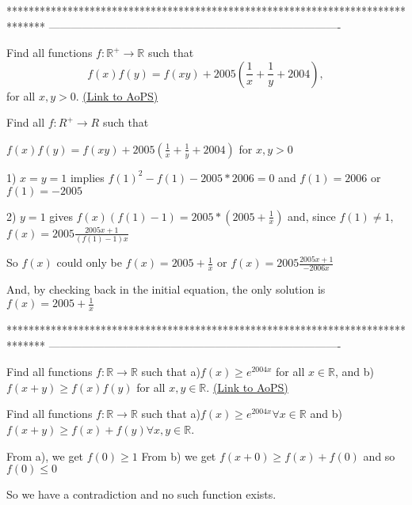 *******************************************************************************
-------------------------------------------------------------------------------

\begin{problem}
	Find all functions $ f: \mathbb R^{+}\rightarrow \mathbb R$ such that
\[f(x)f(y)=f(xy)+2005\left(\frac{1}{x}+\frac{1}{y}+2004\right),\]
for all $ x,y>0$.
	\flushright \href{https://artofproblemsolving.com/community/c6h156164}{(Link to AoPS)}
\end{problem}



\begin{mysolution}
	\begin{tcolorbox}Find all $ f: R^{+}\rightarrow R$ such that

$ f(x)f(y)=f(xy)+2005(\frac{1}{x}+\frac{1}{y}+2004)$ for $ x,y>0$\end{tcolorbox}

1) $ x=y=1$ implies $ f(1)^{2}-f(1)-2005*2006=0$ and $ f(1)=2006$ or $ f(1)=-2005$

2) $ y=1$ gives $ f(x)(f(1)-1)=2005*(2005+\frac{1}{x})$ and, since $ f(1)\neq 1$, $ f(x)=2005\frac{2005x+1}{(f(1)-1)x}$

So $ f(x)$ could only be $ f(x)=2005+\frac{1}{x}$ or $ f(x)=2005\frac{2005x+1}{-2006x}$

And, by checking back in the initial equation, the only solution is $ f(x)=2005+\frac{1}{x}$
\end{mysolution}
*******************************************************************************
-------------------------------------------------------------------------------

\begin{problem}
	Find all functions $ f: \mathbb{R}\to\mathbb{R}$ such that 
a)$ f(x)\geq e^{2004x}$ for all $x\in\mathbb{R}$, and 
b)$ f(x+y)\geq f(x)f(y)$ for all $x,y\in\mathbb{R}$.
	\flushright \href{https://artofproblemsolving.com/community/c6h158846}{(Link to AoPS)}
\end{problem}



\begin{mysolution}
	\begin{tcolorbox}Find all functions $ f: \mathbb{R}\to\mathbb{R}$ such that 
a)$ f(x)\geq e^{2004x}\forall x\in\mathbb{R}$ and 
b)$ f(x+y)\geq f(x)+f(y)\forall x,y\in\mathbb{R}$.\end{tcolorbox}

From a), we get $ f(0)\geq 1$
From b) we get $ f(x+0)\geq f(x)+f(0)$ and so $ f(0)\leq 0$

So we have a contradiction and no such function exists.
\end{mysolution}



